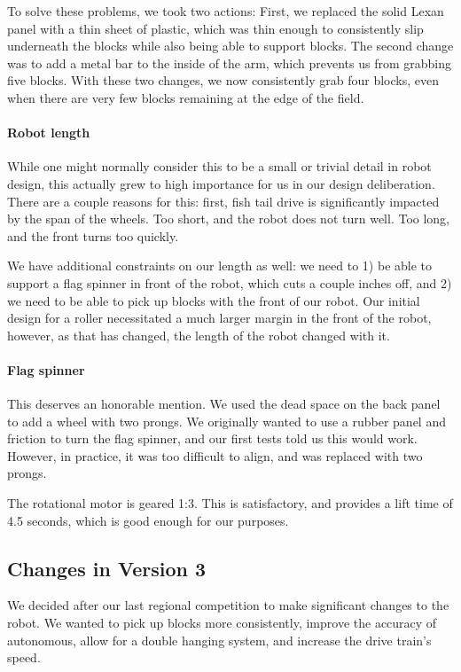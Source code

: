 To solve these problems, we took two actions: First, we replaced the solid Lexan panel with a thin sheet of plastic, which was thin enough to consistently slip underneath the blocks while also being able to support blocks. The second change was to add a metal bar to the inside of the arm, which prevents us from grabbing five blocks. With these two changes, we now consistently grab four blocks, even when there are very few blocks remaining at the edge of the field.

\paragraph{Robot length} While one might normally consider this to be a small or trivial detail in robot design, this actually grew to high importance for us in our design deliberation. There are a couple reasons for this: first, fish tail drive is significantly impacted by the span of the wheels. Too short, and the robot does not turn well. Too long, and the front turns too quickly.

We have additional constraints on our length as well: we need to 1) be able to support a flag spinner in front of the robot, which cuts a couple inches off, and 2) we need to be able to pick up blocks with the front of our robot. Our initial design for a roller necessitated a much larger margin in the front of the robot, however, as that has changed, the length of the robot changed with it. 

\paragraph{Flag spinner} This deserves an honorable mention. We used the dead space on the back panel to add a wheel with two prongs. We originally wanted to use a rubber panel and friction to turn the flag spinner, and our first tests told us this would work. However, in practice, it was too difficult to align, and was replaced with two prongs. 

The rotational motor is geared 1:3. This is satisfactory, and provides a lift time of 4.5 seconds, which is good enough for our purposes.

\newpage \subsection{Changes in Version 3}

We decided after our last regional competition to make significant changes to the robot. We wanted to pick up blocks more consistently, improve the accuracy of autonomous, allow for a double hanging system, and increase the drive train's speed. 

